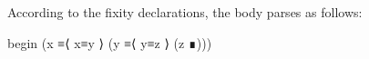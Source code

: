 \begin{fence}
\begin{code}%
\>[0]\AgdaSpace{}%
\AgdaSymbol{:}\AgdaSpace{}%
\AgdaSpace{}%
\AgdaSymbol{\{}\AgdaSpace{}%
\AgdaSymbol{:}\AgdaSpace{}%
\AgdaSymbol{\}}\AgdaSpace{}%
\AgdaSymbol{\{}\AgdaSpace{}%
\AgdaSpace{}%
\AgdaSpace{}%
\AgdaSymbol{:}\AgdaSpace{}%
\AgdaSymbol{\}}\<%
\\
\>[0][@{}l@{\AgdaIndent{0}}]%
\>[2]\AgdaSpace{}%
\AgdaSpace{}%
\AgdaSpace{}%
\<%
\\
%
\>[2]%
\>[264I]\AgdaSpace{}%
\AgdaSpace{}%
\<%
\\
\>[.][@{}l@{}]\<[264I]%
\>[4]\AgdaComment{-----}\<%
\\
%
\>[2]\AgdaSpace{}%
\AgdaSpace{}%
\AgdaSpace{}%
\<%
\\
\>[0]\AgdaSpace{}%
\AgdaSymbol{\{}\AgdaSymbol{\}}\AgdaSpace{}%
\AgdaSymbol{\{}\AgdaSymbol{\}}\AgdaSpace{}%
\AgdaSymbol{\{}\AgdaSymbol{\}}\AgdaSpace{}%
\AgdaSymbol{\{}\AgdaSymbol{\}}\AgdaSpace{}%
\AgdaSpace{}%
\AgdaSpace{}%
\AgdaSymbol{=}\<%
\\
\>[0][@{}l@{\AgdaIndent{0}}]%
\>[2]\<%
\\
\>[2][@{}l@{\AgdaIndent{0}}]%
\>[4]\<%
\\
%
\>[2]\AgdaSpace{}%
\AgdaSpace{}%
\<%
\\
\>[2][@{}l@{\AgdaIndent{0}}]%
\>[4]\<%
\\
%
\>[2]\AgdaSpace{}%
\AgdaSpace{}%
\<%
\\
\>[2][@{}l@{\AgdaIndent{0}}]%
\>[4]\<%
\\
%
\>[2]\<%
\end{code}
\end{fence}

According to the fixity declarations, the body parses as follows:

\begin{myDisplay}
begin (x ≡⟨ x≡y ⟩ (y ≡⟨ y≡z ⟩ (z ∎)))
\end{myDisplay}

